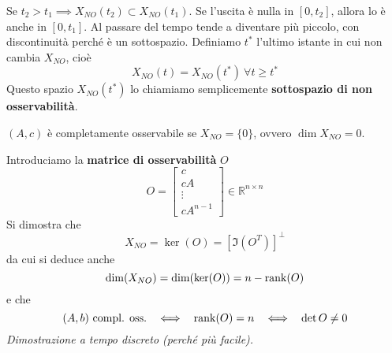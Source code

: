 Se $t_2  >t_1 \implies X_{NO}(t_2) \subset X_{NO}(t_1)$. Se l'uscita è nulla in $[ 0,t_2]$, allora lo è anche in $[ 0,t_1]$. Al passare del tempo tende a diventare più piccolo, con discontinuità perché è un sottospazio. Definiamo $t^{*}$ l'ultimo istante in cui non cambia $X_{NO}$, cioè
\begin{equation*}
	X_{NO}(t) =X_{NO}\left(t^{*}\right) \ \forall t\geq t^{*}
\end{equation*}
Questo spazio $X_{NO}\left(t^{*}\right)$ lo chiamiamo semplicemente \textbf{sottospazio di non osservabilità}.
\begin{defn}
	$(A,c)$ è completamente osservabile se $X_{NO} =\{0\}$, ovvero $\dim X_{NO} =0$.
\end{defn}
Introduciamo la \textbf{matrice di osservabilità} $O$
\begin{equation*}
	\boxed{O=\begin{bmatrix}
		c\\
		cA\\
		\vdots \\
		cA^{n-1}
		\end{bmatrix} \in \mathbb{R}^{n\times n}
	}
\end{equation*}
Si dimostra che
\begin{equation*}
	X_{NO} =\ker(O) =\left[\Im\left(O^T\right)\right]^{\perp }
\end{equation*}
da cui si deduce anche
\begin{equation*}
	\dim(X_{NO}) =\dim(\ker(O)) =n-\operatorname*{rank}(O)
\end{equation*}
e che
\begin{equation*}
	(A,b) \ \text{compl. oss.} \ \ \iff \ \ \operatorname*{rank}(O) =n\ \ \iff \ \ \det O\neq 0
\end{equation*}
\textit{Dimostrazione a tempo discreto (perché più facile).}


